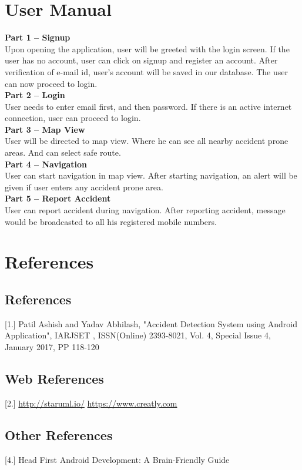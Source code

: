 \documentclass{article}
\begin{document}
\begin{flushleft}
    \section{User Manual}
        \textbf{Part 1 – Signup }\\
Upon opening the application, user will be greeted with the login screen. If the user has no account,
user can click on signup and register an account. After verification of e-mail id, user’s account will be saved in our database. The user can now proceed
to login.  \\
\newline
\textbf{Part 2 – Login} \\
User needs to enter email first, and then password. If there is an active internet connection, user can proceed to login. \\
\newline
\textbf{Part 3 – Map View} \\
User will be directed to map view. Where he can see all nearby accident prone areas. And can select safe route.
\\
\newline
\textbf{Part 4 – Navigation} \\
User can start navigation in map view. After starting navigation, an alert will be given if user enters any accident prone area. \\
\newline
\textbf{Part 5 – Report Accident} \\
User can report accident during navigation. After reporting accident, message would be broadcasted to all his registered mobile numbers.

    \newpage
    
    \section{References}
    \subsection{References}
    [1.] Patil Ashish and Yadav Abhilash, "Accident Detection System using Android Application", IARJSET , ISSN(Online) 2393-8021, Vol. 4, Special Issue 4, January 2017, PP 118-120 

    
    \subsection{Web References}
    
        [2.] \url{http://staruml.io/}  \newline
        [3.] \url{https://www.creatly.com}
    
    \subsection{Other References}
    
    [4.] Head First Android Development: A Brain-Friendly Guide  
    \newpage
            
    
\end{flushleft}
\end{document}
